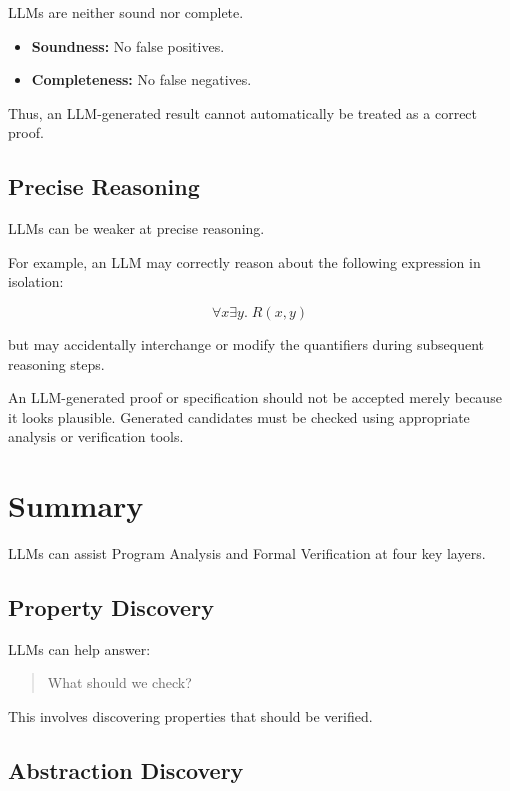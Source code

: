 LLMs are neither sound nor complete.

\begin{itemize}
    \item \textbf{Soundness:} No false positives.
    \item \textbf{Completeness:} No false negatives.
\end{itemize}

Thus, an LLM-generated result cannot automatically be treated as a
correct proof.

\subsection{Precise Reasoning}

LLMs can be weaker at precise reasoning.

For example, an LLM may correctly reason about the following expression
in isolation:

\[
\forall x \exists y.\; R(x,y)
\]

but may accidentally interchange or modify the quantifiers during
subsequent reasoning steps.

\begin{pppitfall}
An LLM-generated proof or specification should not be accepted merely
because it looks plausible. Generated candidates must be checked using
appropriate analysis or verification tools.
\end{pppitfall}


\section{Summary}

LLMs can assist Program Analysis and Formal Verification at four key
layers.

\subsection{Property Discovery}

LLMs can help answer:

\begin{quote}
What should we check?
\end{quote}

This involves discovering properties that should be verified.

\subsection{Abstraction Discovery}

